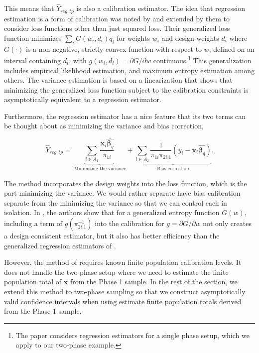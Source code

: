 \documentclass[12pt]{article}
\renewcommand{\bf}[1]{\mathbf{#1}}
\begin{document}
This means that $\hat Y_{reg, tp}$ is also a calibration estimator. The idea
that regression estimation is a form of calibration was noted by
\cite{deville1992calibration} and extended by them to consider loss functions
other than just squared loss. Their generalized loss function minimizes
$\sum_i G(w_i, d_i)q_i$ for weights $w_i$ and design-weights $d_i$ where
$G(\cdot)$ is a non-negative, strictly convex function with respect to $w$,
defined on an interval containing $d_i$, with $g(w_i, d_i) = \partial G /
\partial w$ continuous.\footnote{The \cite{deville1992calibration} paper
considers regression estimators for a single phase setup, which we apply to our
two-phase example.} This
generalization includes empirical likelihood estimation, and maximum entropy
estimation among others. The variance estimation is based on a linearization
that shows that minimizing the generalized loss function subject to the
calibration constraints is asymptotically equivalent to a regression estimator.

Furthermore, the regression estimator
has a nice feature that its two terms can be thought about as minimizing the
variance and bias correction,

$$ 
\hat Y_{reg, tp} 
= \underbrace{\sum_{i \in A_1} \frac{\bf x_i \hat{\bm \beta_q}}{\pi_{1i}}}_{
  \text{ Minimizing the variance}} + \underbrace{\sum_{i \in A_2}
\frac{1}{\pi_{1i}\pi_{2i|1}} (y_i - \bf x_i \hat{\bm \beta_q})}_{
\text{Bias correction}}.
$$

The \cite{deville1992calibration} method incorporates the design weights into
the loss function, which is the part minimizing the variance. We would rather
separate have bias calibration separate from the minimizing the variance so that
we can control each in isolation. In
\cite{kwon2024debiased}, the authors show that for a generalized entropy
function $G(w)$, including a term of $g(\pi_{2i|1}^{-1})$ into the calibration
for $g = \partial G / \partial w$ not only creates a design consistent
estimator, but it also has better efficiency than the generalized regression
estimators of \cite{deville1992calibration}.

However, the method of \cite{kwon2024debiased} requires known finite population 
calibration levels. It does not handle the
two-phase setup where we need to estimate the finite population total of $\bf x$
from the Phase 1 sample. In the rest of the section, we extend this method to 
two-phase sampling so that we construct asymptotically valid confidence
intervals when using estimate finite population totals derived from the Phase 1
sample.
\end{document}
